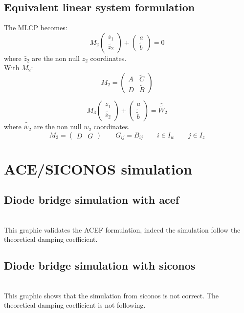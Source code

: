 \subsection{Equivalent linear system formulation}
The MLCP becomes:\\
\[\label{system2} M_{2} \left(\begin{array}{c} z_{1}\\ \widetilde{z_{2}}
\end{array}\right)+\left(\begin{array}{c} a\\ \widetilde{b}\end{array}\right)=0 \]
where $\widetilde{z_{2}}$ are the non null $z_{2}$ coordinates.\\
With $M_{2}$:
\[M_{2}=\left(\begin{array}{cc} A&\widetilde{C}\\D&\widetilde{B} \end{array}\right)\]

\[\label{system3} M_{3} \left(\begin{array}{c} z_{1}\\ \widetilde{z_{2}}
\end{array}\right)+\left(\begin{array}{c} a\\ \widetilde{\widetilde{b}}\end{array}\right)=\widetilde{\widetilde{W_{2}}} \]
where $\widetilde{\widetilde{w_{2}}}$ are the non null $w_{2}$ coordinates.
\[M_{3}=\left(\begin{array}{cc} D&G \end{array}\right)\qquad G_{ij}=B_{ij} \qquad i \in I_{w} \qquad
j \in I_{z}\]

\section{ACE/SICONOS simulation}

\subsection{Diode bridge simulation with acef}

\\
This graphic validates the ACEF formulation, indeed the simulation follow the theoretical damping coefficient.
\subsection{Diode bridge simulation with siconos}

\\
This graphic shows that the simulation from siconos is not correct. The theoretical damping
coefficient is not following.
